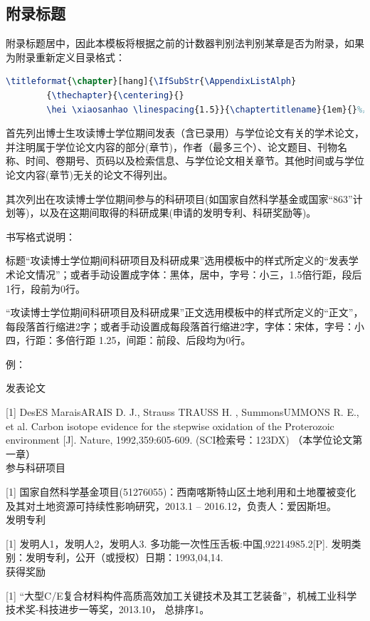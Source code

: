 \documentclass[master]{dutthesis} %
\begin{document}
\begin{Appendix}
    \section{附录标题}
    附录标题居中，因此本模板将根据之前的计数器判别法判别某章是否为附录，如果为附录重新定义目录格式：
    \begin{lstlisting}[language=TeX]
	    \titleformat{\chapter}[hang]{\IfSubStr{\AppendixListAlph}
	    {\thechapter}{\centering}{}
	    \hei \xiaosanhao \linespacing{1.5}}{\chaptertitlename}{1em}{}%黑体 小三
    \end{lstlisting}
\end{Appendix}
\begin{Publics}
    首先列出博士生攻读博士学位期间发表（含已录用）与学位论文有关的学术论文，并注明属于学位论文内容的部分(章节)，作者（最多三个）、论文题目、刊物名称、时间、卷期号、页码以及检索信息、与学位论文相关章节。其他时间或与学位论文内容(章节)无关的论文不得列出。

其次列出在攻读博士学位期间参与的科研项目(如国家自然科学基金或国家“863”计划等)，以及在这期间取得的科研成果(申请的发明专利、科研奖励等)。

书写格式说明：

标题“攻读博士学位期间科研项目及科研成果”选用模板中的样式所定义的“发表学术论文情况”；或者手动设置成字体：黑体，居中，字号：小三，1.5倍行距，段后1行，段前为0行。

“攻读博士学位期间科研项目及科研成果”正文选用模板中的样式所定义的“正文”，每段落首行缩进2字；或者手动设置成每段落首行缩进2字，字体：宋体，字号：小四，行距：多倍行距 1.25，间距：前段、后段均为0行。

例：

发表论文

[1] DesES MaraisARAIS D. J., Strauss TRAUSS H. , SummonsUMMONS R. E., et al. Carbon isotope evidence for the stepwise oxidation of the Proterozoic environment [J]. Nature, 1992,359:605-609. (SCI检索号：123DX) （本学位论文第一章）
~\\

参与科研项目

[1] 国家自然科学基金项目(51276055)：西南喀斯特山区土地利用和土地覆被变化及其对土地资源可持续性影响研究，2013.1 – 2016.12，负责人：爱因斯坦。
~\\

发明专利

[1] 发明人1，发明人2，发明人3. 多功能一次性压舌板:中国,92214985.2[P]. 发明类别：发明专利，公开（或授权）日期：1993,04,14.
~\\


获得奖励

[1] “大型C/E复合材料构件高质高效加工关键技术及其工艺装备”，机械工业科学技术奖-科技进步一等奖，2013.10， 总排序1。
\end{Publics}
\end{document}
